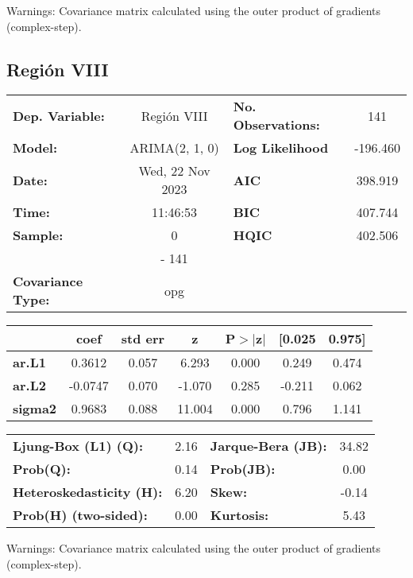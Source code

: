 \documentclass{article}%
\begin{document}
Warnings: \newline
 [1] Covariance matrix calculated using the outer product of gradients (complex-step).%
\subsection*{Región VIII}%
\begin{center}
\begin{tabular}{lclc}
\toprule
\textbf{Dep. Variable:}          &   Región VIII    & \textbf{  No. Observations:  } &    141      \\
\textbf{Model:}                  &  ARIMA(2, 1, 0)  & \textbf{  Log Likelihood     } &  -196.460   \\
\textbf{Date:}                   & Wed, 22 Nov 2023 & \textbf{  AIC                } &  398.919    \\
\textbf{Time:}                   &     11:46:53     & \textbf{  BIC                } &  407.744    \\
\textbf{Sample:}                 &        0         & \textbf{  HQIC               } &  402.506    \\
\textbf{}                        &       - 141      & \textbf{                     } &             \\
\textbf{Covariance Type:}        &       opg        & \textbf{                     } &             \\
\bottomrule
\end{tabular}
\begin{tabular}{lcccccc}
                & \textbf{coef} & \textbf{std err} & \textbf{z} & \textbf{P$> |$z$|$} & \textbf{[0.025} & \textbf{0.975]}  \\
\midrule
\textbf{ar.L1}  &       0.3612  &        0.057     &     6.293  &         0.000        &        0.249    &        0.474     \\
\textbf{ar.L2}  &      -0.0747  &        0.070     &    -1.070  &         0.285        &       -0.211    &        0.062     \\
\textbf{sigma2} &       0.9683  &        0.088     &    11.004  &         0.000        &        0.796    &        1.141     \\
\bottomrule
\end{tabular}
\begin{tabular}{lclc}
\textbf{Ljung-Box (L1) (Q):}     & 2.16 & \textbf{  Jarque-Bera (JB):  } & 34.82  \\
\textbf{Prob(Q):}                & 0.14 & \textbf{  Prob(JB):          } &  0.00  \\
\textbf{Heteroskedasticity (H):} & 6.20 & \textbf{  Skew:              } & -0.14  \\
\textbf{Prob(H) (two-sided):}    & 0.00 & \textbf{  Kurtosis:          } &  5.43  \\
\bottomrule
\end{tabular}
\end{center}

Warnings: \newline
 [1] Covariance matrix calculated using the outer product of gradients (complex-step).

%
\end{document}
